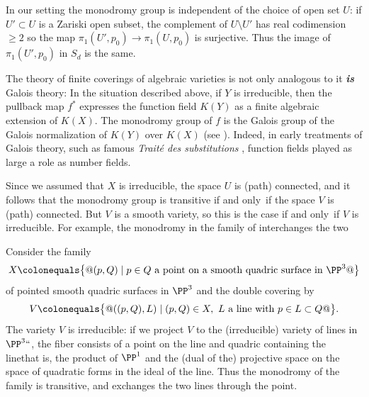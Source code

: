 \begin{fact}\label{Galois equals monodromy}
In our setting  the monodromy group is independent of the choice of open
set $U$: if $U' \subset U$ is a Zariski open subset, the complement of
$U\setminus U'$ has
real codimension $\geq 2$ so the map $\pi_1(U', p_0) \to \pi_1(U,p_0)$
is surjective. Thus the image of $\pi_1(U', p_0)$ in $S_d$ is the same.

The theory of finite coverings of algebraic varieties is not only
analogous to 
it \emph{\bfseries{is}} Galois theory: In the situation
described above, if $Y$ is irreducible, then the pullback map $f^*$
expresses the function field $K(Y)$ as a finite algebraic extension of
$K(X)$. The monodromy group of $f$  is the Galois group of the Galois
%
normalization of $K(Y)$ over $K(X)$ (see \cite{Harris1979}). Indeed,
in early treatments of Galois theory, such as 
famous \emph{Trait\'e
%
des substitutions} \citeyear{MR1188877}, 
function fields played as large a role as number fields.
%
%
\end{fact}

Since we assumed that $X$ is irreducible, the space $U$ is (path)
connected, and it follows that the monodromy group is transitive if and
%
only~if the space $V$ is (path) connected. But $V$ is a smooth
variety, so this is the case if and only~if $V$ is irreducible. For
example, the monodromy in the family
of 
interchanges the two 
%
%

\begin{example}\label{monodromy of rulings}
Consider the family
$$
X \colonequals  \big\{@(p,Q) \mid p\in Q\hbox{ a point on a smooth quadric
surface in $\PP^3$}@\big\}
$$
of pointed smooth quadric surfaces in $\PP^3$ and the double covering by
$$
V\colonequals  \big\{@((p,Q), L)\mid (p,Q)\in X,\ L \hbox{ a line with $p
\in L\subset Q$}@\big\}.
$$
The variety $V$ is irreducible: if we project $V$ to the (irreducible)
variety of lines in $\PP^3` `$,
the fiber consists of a point on the line and quadric containing the
line\emdash that is, the product
of $\PP^1$ and the (dual of the) projective space
on the space of quadratic forms in the ideal of the line. Thus the
monodromy of the family
is transitive, and exchanges the two lines through the point.
\end{example}

